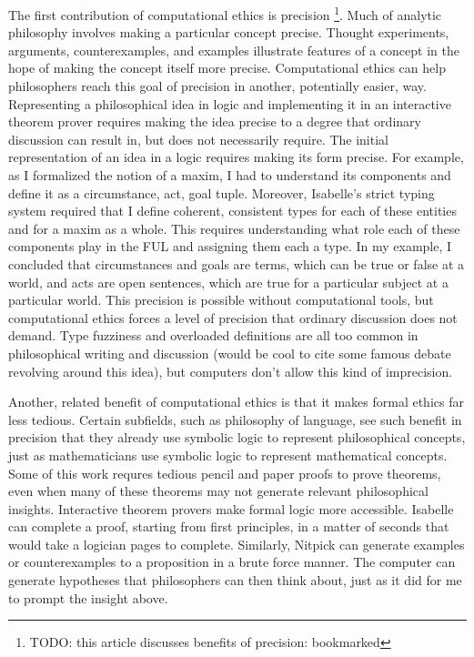 \begin{isabellebody}
\begin{isamarkuptext}
The first contribution of computational ethics is precision \footnote{TODO: this article discusses 
benefits of precision: bookmarked}. Much of analytic philosophy involves 
making a particular concept precise. Thought experiments, arguments, counterexamples, and examples 
illustrate features of a concept in the hope of making the concept itself more precise. Computational 
ethics can help philosophers reach this goal of precision in another, potentially easier, way. 
Representing a philosophical idea in logic and implementing it in an interactive theorem prover requires 
making the idea precise to a degree that ordinary discussion can result in, but does not necessarily require. The initial representation 
of an idea in a logic requires making its form precise. For example, 
as I formalized the notion of a maxim, I had to understand its components and define it as a 
circumstance, act, goal tuple. Moreover, Isabelle's strict typing system required that I define 
coherent, consistent types for each of these entities and for a maxim as a whole. This requires understanding 
what role each of these components play in the FUL and assigning them each a type. In my example, I 
concluded that circumstances and goals are terms, which can be true or false at a world, and acts are 
open sentences, which are true for a particular subject at a particular world. This precision is possible 
without computational tools, but computational ethics forces a level of precision that ordinary discussion 
does not demand. Type fuzziness and overloaded definitions are all too common in philosophical writing and 
discussion (would be cool to cite some famous debate revolving around this idea), but computers don't 
allow this kind of imprecision.

Another, related benefit of computational ethics is that it makes formal ethics far less tedious. 
Certain subfields, such as philosophy of language, see such benefit in precision that they already 
use symbolic logic to represent philosophical concepts, just as mathematicians use symbolic logic to 
represent mathematical concepts. Some of this work requres tedious pencil and paper proofs to prove 
theorems, even when many of these theorems may not generate relevant philosophical insights. Interactive 
theorem provers make formal logic more accessible. Isabelle can complete a proof, starting from first principles, 
in a matter of seconds that would take a logician pages to complete. Similarly, Nitpick can generate 
examples or counterexamples to a proposition in a brute force manner. The computer can generate hypotheses
that philosophers can then think about, just as it did for me to prompt the insight above.


\end{isamarkuptext}
\end{isabellebody}
